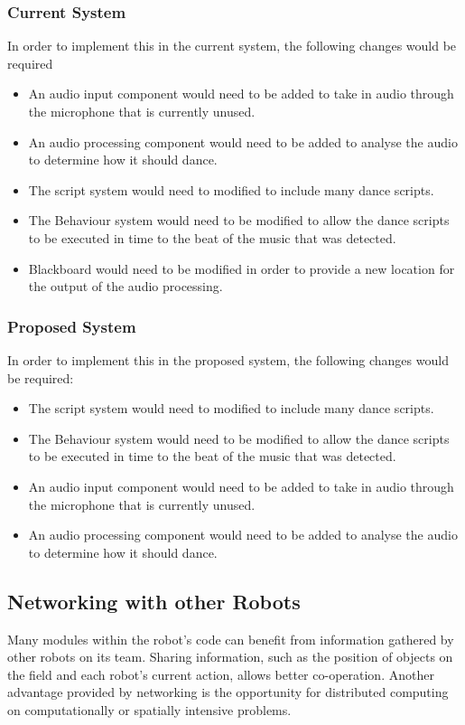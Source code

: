 \documentclass[english,12pt]{scrartcl}
\begin{document}
			\subsubsection{Current System}
				In order to implement this in the current system, the following changes would be required
				\begin{itemize}
					\item An audio input component would need to be added to take in audio through the microphone that is currently unused.
					\item An audio processing component would need to be added to analyse the audio to determine how it should dance.
					\item The script system would need to modified to include many dance scripts.
					\item The Behaviour system would need to be modified to allow the dance scripts to be executed in time to the beat of the music that was detected.
					\item Blackboard would need to be modified in order to provide a new location for the output of the audio processing.
				\end{itemize}
				
			\subsubsection{Proposed System}
				In order to implement this in the proposed system, the following changes would be required:
				\begin{itemize}
					\item The script system would need to modified to include many dance scripts.
					\item The Behaviour system would need to be modified to allow the dance scripts to be executed in time to the beat of the music that was detected.
					\item An audio input component would need to be added to take in audio through the microphone that is currently unused.
					\item An audio processing component would need to be added to analyse the audio to determine how it should dance.
				\end{itemize}
				
		\subsection{Networking with other Robots}
			Many modules within the robot’s code can benefit from information gathered by other robots on its team.
			Sharing information, such as the position of objects on the field and each robot’s current action, allows better co-operation.
			Another advantage provided by networking is the opportunity for distributed computing on computationally or spatially intensive problems.
			
\end{document}
